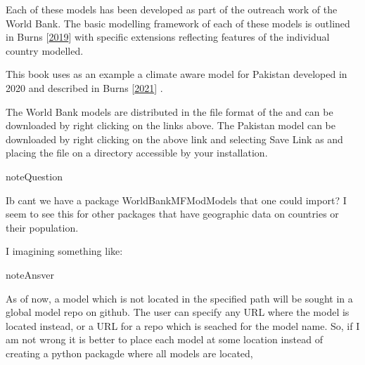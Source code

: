 \documentclass[letterpaper,10pt,english]{jupyterBook}
\begin{document}
\sphinxAtStartPar
Each of these models has been developed as part of the outreach work of the World Bank.  The basic modelling framework of each of these models is outlined in Burns  {[}\hyperlink{cite.content/99_BackMatter/References:id15}{2019}{]} with specific extensions reflecting features of the individual country modelled.

\sphinxAtStartPar
This book uses as an example a climate aware model for Pakistan developed in 2020 and described in Burns  {[}\hyperlink{cite.content/99_BackMatter/References:id14}{2021}{]} .

\sphinxAtStartPar
The World Bank models are distributed in the  file format of the  and can be downloaded by right clicking on the links above.  The Pakistan model can be downloaded  by right clicking on the above link and selecting Save Link as and placing the file on a directory accessible by your  installation.

\begin{sphinxadmonition}{note}{Question}

\begin{sphinxVerbatim}[commandchars=\\\{\}]
Ib can\PYGZsq{}t we have a package WorldBankMFModModels that one could import?  I seem to see this for other packages that have geographic data on countries or their population.   
\end{sphinxVerbatim}

\sphinxAtStartPar
I imagining something like:
\end{sphinxadmonition}

\sphinxAtStartPar
{}

\begin{sphinxadmonition}{note}{Ansver}

\sphinxAtStartPar
As of now, a model which is not located in the specified path will be sought in a global model repo on github. The user can specify any URL where the model is located instead, or a URL for a repo which is seached for the model name. So, if I am not wrong it is better to place each model at some location instead of creating a python packagde where all models are located,
\end{sphinxadmonition}
\end{document}
